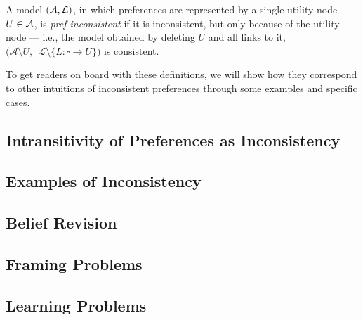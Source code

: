 \documentclass{article}
\begin{document}
	\begin{defn}
		A model $(\cal A, L)$, in which preferences are represented by a single utility node $U \in \cal A$, is \textit{pref-inconsistent} if it is inconsistent, but only because of the utility node --- i.e., the model obtained by deleting $U$ and all links to it, $\big(\mathcal A \setminus U,~~\mathcal L \setminus \{ L : \square\to U \}\big)$ is consistent.
	\end{defn}

	To get readers on board with these definitions, we will show how they correspond to other intuitions of inconsistent preferences through some examples and specific cases.
	
	\subsection{Intransitivity of Preferences as Inconsistency}
	



	
	\subsection{Examples of Inconsistency}


	\subsection{Belief Revision}
	
	\subsection{Framing Problems}
	\subsection{Learning Problems}
\end{document}
